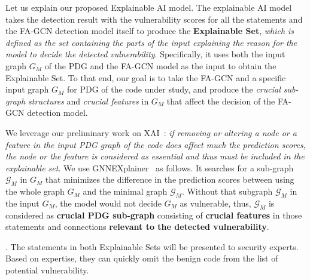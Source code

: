 Let us explain our proposed Explainable AI model.  The explainable AI model takes the detection result with
the vulnerability scores for all the statements and the FA-GCN
detection model itself to produce the {\bf Explainable Set}, {\em
  which is defined as the set containing the parts of the input
  explaining the reason for the model to decide the detected
  vulnerability}. Specifically, it uses both the input graph $G_M$ of
the PDG and the FA-GCN model as the input to obtain the Explainable
Set.  To that end, our goal is to take the FA-GCN and a specific input
graph $G_M$ for PDG of the code under study, and produce the {\em
  crucial sub-graph structures} and {\em crucial features} in $G_M$
that affect the decision of the FA-GCN detection model.

We leverage our preliminary work on XAI~\cite{fse21-submission}: {\em if removing or altering a node or a feature in the
  input PDG graph of the code does affect much the prediction scores,
  the node or the feature is considered as essential and thus must be
  included in the explainable set}. We use
GNNEXplainer~\cite{GNNExplainer} as follows. It searches for a
sub-graph $\mathcal{G}_M$ in $G_M$ that minimizes the difference in
the prediction scores between using the whole graph $G_M$ and the
minimal graph $\mathcal{G}_M$. Without that subgraph $\mathcal{G}_M$
in the input $G_M$, the model would not decide $G_M$ as vulnerable,
thus, $\mathcal{G}_M$ is considered as {\bf crucial PDG sub-graph}
consisting of {\bf crucial features} in those statements and
connections {\bf relevant to the detected vulnerability}.

.  The statements in
both Explainable Sets will be presented to security experts. Based on
expertise, they can quickly omit the benign code from the list of
potential vulnerability.


   

